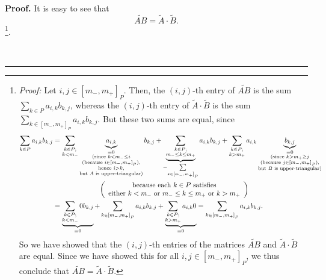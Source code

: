 \documentclass[numbers=enddot,12pt,final,onecolumn,notitlepage]{scrartcl}%
\numberwithin{exer}{section}
\theoremstyle{definition}
\newenvironment{proof}[1][Proof]{\noindent\textbf{#1.} }{\ \rule{0.5em}{0.5em}}
\let\sumnonlimits\sum
\renewcommand{\sum}{\sumnonlimits\limits}
\theoremstyle{plainsl}
\begin{document}
\begin{proof}
It is easy to see that%
\begin{equation}
\widetilde{AB}=\widetilde{A}\cdot\widetilde{B}.
\label{pf.lem.Stilde.coproduct.CB5.1}%
\end{equation}
\footnote{\textit{Proof:} Let $i,j\in\left[  m_{-},m_{+}\right]  _{P}$. Then,
the $\left(  i,j\right)  $-th entry of $\widetilde{AB}$ is the sum $\sum_{k\in
P}a_{i,k}b_{k,j}$, whereas the $\left(  i,j\right)  $-th entry of
$\widetilde{A}\cdot\widetilde{B}$ is the sum $\sum_{k\in\left[  m_{-}%
,m_{+}\right]  _{P}}a_{i,k}b_{k,j}$. But these two sums are equal, since
\begin{align*}
\sum_{k\in P}a_{i,k}b_{k,j}  &  =\sum_{\substack{k\in P;\\k<m_{-}%
}}\underbrace{a_{i,k}}_{\substack{=0\\\text{(since }k<m_{-}\leq
i\\\text{(because }i\in\left[  m_{-},m_{+}\right]  _{P}\text{),}\\\text{hence
}i>k\text{,}\\\text{but }A\text{ is upper-triangular)}}}b_{k,j}%
+\underbrace{\sum_{\substack{k\in P;\\m_{-}\leq k\leq m_{+}}}}_{=\sum
_{k\in\left[  m_{-},m_{+}\right]  _{P}}}a_{i,k}b_{k,j}+\sum_{\substack{k\in
P;\\k>m_{+}}}a_{i,k}\underbrace{b_{k,j}}_{\substack{=0\\\text{(since }%
k>m_{+}\geq j\\\text{(because }j\in\left[  m_{-},m_{+}\right]  _{P}%
\text{),}\\\text{but }B\text{ is upper-triangular)}}}\\
&  \ \ \ \ \ \ \ \ \ \ \ \ \ \ \ \ \ \ \ \ \left(
\begin{array}
[c]{c}%
\text{because each }k\in P\text{ satisfies}\\
\text{either }k<m_{-}\text{ or }m_{-}\leq k\leq m_{+}\text{ or }k>m_{+}%
\end{array}
\right) \\
&  =\underbrace{\sum_{\substack{k\in P;\\k<m_{-}}}0b_{k,j}}_{=0}+\sum
_{k\in\left[  m_{-},m_{+}\right]  _{P}}a_{i,k}b_{k,j}+\underbrace{\sum
_{\substack{k\in P;\\k>m_{+}}}a_{i,k}0}_{=0}=\sum_{k\in\left[  m_{-}%
,m_{+}\right]  _{P}}a_{i,k}b_{k,j}.
\end{align*}
So we have showed that the $\left(  i,j\right)  $-th entries of the matrices
$\widetilde{AB}$ and $\widetilde{A}\cdot\widetilde{B}$ are equal. Since we
have showed this for all $i,j\in\left[  m_{-},m_{+}\right]  _{P}$, we thus
conclude that $\widetilde{AB}=\widetilde{A}\cdot\widetilde{B}$.}.


\end{proof}
\end{document}
